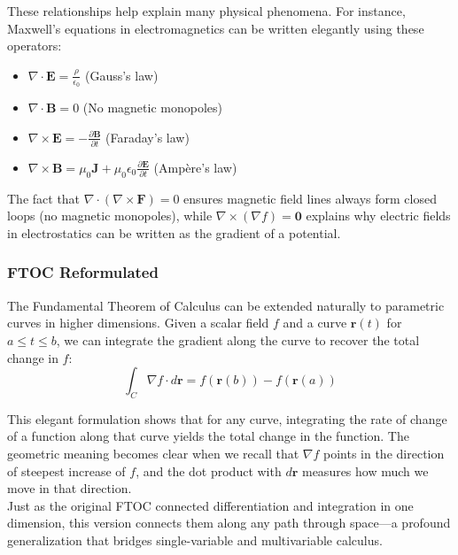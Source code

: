\noindent These relationships help explain many physical phenomena. For instance, Maxwell's equations in electromagnetics can be written elegantly using these operators:
\begin{itemize}
    \item $\nabla \cdot \mathbf{E} = \frac{\rho}{\epsilon_0}$ (Gauss's law)
    \item $\nabla \cdot \mathbf{B} = 0$ (No magnetic monopoles)
    \item $\nabla \times \mathbf{E} = -\frac{\partial \mathbf{B}}{\partial t}$ (Faraday's law)
    \item $\nabla \times \mathbf{B} = \mu_0\mathbf{J} + \mu_0\epsilon_0\frac{\partial \mathbf{E}}{\partial t}$ (Ampère's law)
\end{itemize}

\noindent The fact that $\nabla \cdot (\nabla \times \mathbf{F}) = 0$ ensures magnetic field lines always form closed loops (no magnetic monopoles), while $\nabla \times (\nabla f) = \mathbf{0}$ explains why electric fields in electrostatics can be written as the gradient of a potential.

\subsubsection*{FTOC Reformulated}

\noindent The Fundamental Theorem of Calculus can be extended naturally to parametric curves in higher dimensions. Given a scalar field $f$ and a curve $\mathbf{r}(t)$ for $a \leq t \leq b$, we can integrate the gradient along the curve to recover the total change in $f$:
\[
\int_C \nabla f \cdot d\mathbf{r} = f(\mathbf{r}(b)) - f(\mathbf{r}(a))
\]

\noindent This elegant formulation shows that for any curve, integrating the rate of change of a function along that curve yields the total change in the function. The geometric meaning becomes clear when we recall that $\nabla f$ points in the direction of steepest increase of $f$, and the dot product with $d\mathbf{r}$ measures how much we move in that direction. \\

\noindent Just as the original FTOC connected differentiation and integration in one dimension, this version connects them along any path through space—a profound generalization that bridges single-variable and multivariable calculus.

